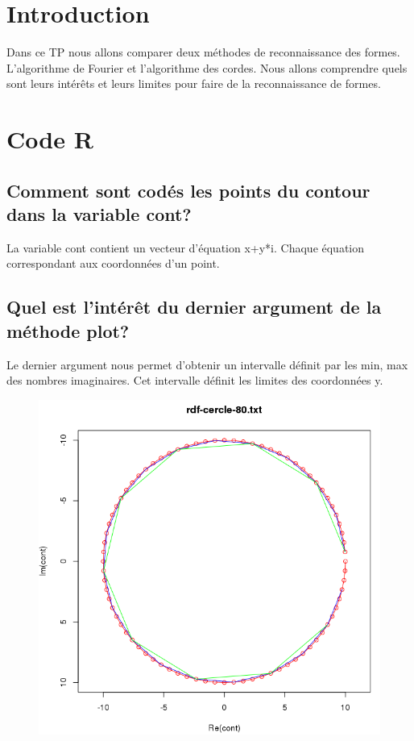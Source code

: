 \documentclass[a4paper,12pt]{report}
\begin{document}


\setcounter{page}{1} 
\newpage

\section*{Introduction}

Dans ce TP nous allons comparer deux méthodes de reconnaissance des formes. L'algorithme de Fourier et l'algorithme des cordes. Nous allons comprendre quels sont leurs intérêts et leurs limites pour faire de la reconnaissance de formes.

\section*{Code R}

\subsection*{Comment sont codés les points du contour dans la variable cont?}

La variable cont contient un vecteur d'équation x+y*i. Chaque équation correspondant aux coordonnées d'un point.

\subsection*{Quel est l'intérêt du dernier argument de la méthode plot?}

Le dernier argument nous permet d'obtenir un intervalle définit par les min, max des nombres imaginaires. Cet intervalle définit les limites des coordonnées y.

\begin{figure}[!ht]
	\center
	\includegraphics[scale=0.5]{image/contours.png}
\end{figure}
\end{document}
